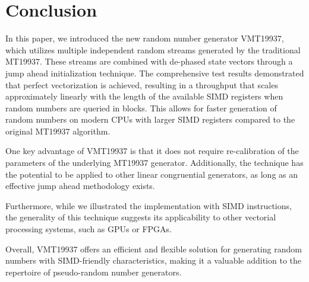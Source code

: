 \documentclass[preprint,1p,times]{elsarticle}
\begin{document}
\section{Conclusion}
\noindent In this paper, we introduced the new random number generator VMT19937, which utilizes multiple independent random streams generated by the traditional MT19937. These streams are combined with de-phased state vectors through a jump ahead initialization technique. The comprehensive test results demonstrated that perfect vectorization is achieved, resulting in a throughput that scales approximately linearly with the length of the available SIMD registers when random numbers are queried in blocks. This allows for faster generation of random numbers on modern CPUs with larger SIMD registers compared to the original MT19937 algorithm.

\noindent One key advantage of VMT19937 is that it does not require re-calibration of the parameters of the underlying MT19937 generator. Additionally, the technique has the potential to be applied to other linear congruential generators, as long as an effective jump ahead methodology exists.

\noindent Furthermore, while we illustrated the implementation with SIMD instructions, the generality of this technique suggests its applicability to other vectorial processing systems, such as GPUs or FPGAs.

\noindent Overall, VMT19937 offers an efficient and flexible solution for generating random numbers with SIMD-friendly characteristics, making it a valuable addition to the repertoire of pseudo-random number generators.
\end{document}
